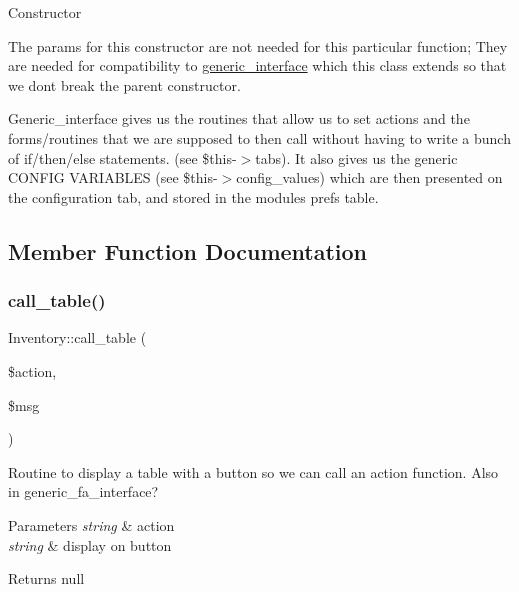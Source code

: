 Constructor

The params for this constructor are not needed for this particular function; They are needed for compatibility to \hyperlink{classgeneric__interface}{generic\+\_\+interface} which this class extends so that we don\textquotesingle{}t break the parent constructor.

Generic\+\_\+interface gives us the routines that allow us to set actions and the forms/routines that we are supposed to then call without having to write a bunch of if/then/else statements. (see \$this-\/$>$tabs). It also gives us the generic C\+O\+N\+F\+IG V\+A\+R\+I\+A\+B\+L\+ES (see \$this-\/$>$config\+\_\+values) which are then presented on the configuration tab, and stored in the modules prefs table. 

\subsection{Member Function Documentation}
\hypertarget{class_inventory_abcdb59c12133ade607ed4ef6d80bec94}{}\label{class_inventory_abcdb59c12133ade607ed4ef6d80bec94} 
\subsubsection{\texorpdfstring{call\+\_\+table()}{call\_table()}}
{\footnotesize\ttfamily Inventory\+::call\+\_\+table (\begin{DoxyParamCaption}\item[{}]{\$action,  }\item[{}]{\$msg }\end{DoxyParamCaption})}

Routine to display a table with a button so we can call an action function. Also in generic\+\_\+fa\+\_\+interface?


\begin{DoxyParams}{Parameters}
{\em string} & action \\
\hline
{\em string} & display on button \\
\hline
\end{DoxyParams}
\begin{DoxyReturn}{Returns}
null 
\end{DoxyReturn}
\hypertarget{class_inventory_a05cfd3bab20f8d1d40a8f83beb23d694}{}\label{class_inventory_a05cfd3bab20f8d1d40a8f83beb23d694} 
